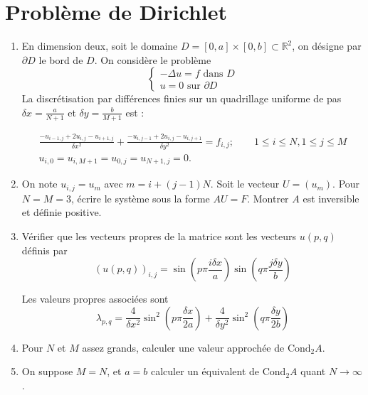 \documentclass[a4paper]{article}
\begin{document}
\section{Problème de Dirichlet}
\begin{enumerate}
\item En dimension deux, soit le domaine  $D = [0, a] \times [0, b]\subset \mathbb{R}^2$, on désigne par $\partial D$ le bord de $D$. On considère le
problème
\[\left\{\begin{array}{l}
-\Delta u = f \mbox{ dans }D\\
u =0 \mbox{ sur }\partial D
\end{array}\right.
\]
La discrétisation par différences finies sur un quadrillage uniforme de pas $\delta x = \frac{a}{N+1}$ et $\delta y = \frac{b}{M+1}$
est : 

\begin{equation}
\begin{array}{l}
\displaystyle \frac {-u_{i-1,j} + 2u_{i,j}-u_{i+1,j}}{\delta x^2} +
\frac {-u_{i,j-1} + 2u_{i,j}-u_{i,j+1}}{\delta y^2}= f_{i,j} ;
 \qquad 1 \leq i  \leq N, 1 \leq j  \leq M \\
u_{i,0} = u_{i,M+1} = u_{0,j} = u_{N+1,j}=0.
\end{array}
\end{equation}

\item On note $u_{i,j}=u_m$ avec $m = i + (j-1)N$. Soit le vecteur $U = (u_m)$.  Pour $N = M = 3$, écrire le système
sous la forme $AU = F$. Montrer $A$ est inversible et définie positive.
\item Vérifier que les vecteurs propres de la matrice sont les vecteurs $u(p,q)$ définis par
\[(u(p,q))_{i,j} = \sin\left(p\pi \frac{i\delta x}{a}\right)\sin\left(q\pi \frac{j\delta y}{b}\right)
\]

Les valeurs propres associées sont
\[\lambda_{p,q} =\frac 4{\delta x^2} \sin^2\left(p\pi \frac{\delta x}{2a}\right)+\frac 4{\delta y^2} \sin^2\left(q\pi \frac{\delta y}{2b}\right)\]

\item Pour $N$ et $M$ assez grands, calculer une valeur approchée de $\mbox{Cond}_2A$.
\item On suppose $M=N$, et $a=b$ calculer un équivalent de  $\mbox{Cond}_2A$ quant $N\to \infty$.

\end{enumerate}
\end{document}
